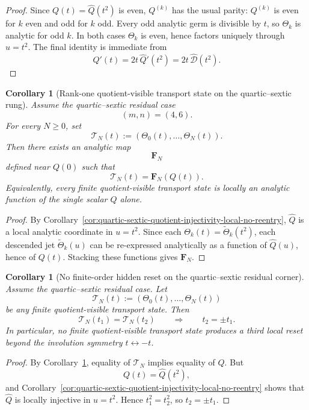 \documentclass[11pt,a4paper]{amsart}
\theoremstyle{plain}
\newtheorem{corollary}[theorem]{Corollary}
\theoremstyle{definition}
\begin{document}
\begin{proof}
Since $Q(t)=\widehat Q(t^2)$ is even, $Q^{(k)}$ has the usual parity:
$Q^{(k)}$ is even for $k$ even and odd for $k$ odd. Every odd analytic
germ is divisible by $t$, so $\Theta_k$ is analytic for odd $k$. In both
cases $\Theta_k$ is even, hence factors uniquely through $u=t^2$. The final
identity is immediate from
\[
Q'(t)=2t\,\widehat Q'(t^2)=2t\,\widehat{\mathcal D}(t^2).
\]
\end{proof}

\begin{corollary}[Rank-one quotient-visible transport state on the quartic--sextic rung]
\label{cor:rank-one-transport-state-quartic-sextic-fixed-shear}
Assume the quartic--sextic residual case
\[
(m,n)=(4,6).
\]
For every $N\ge 0$, set
\[
\mathcal T_N(t):=(\Theta_0(t),\dots,\Theta_N(t)).
\]
Then there exists an analytic map
\[
\mathbf F_N
\]
defined near $Q(0)$ such that
\[
\mathcal T_N(t)=\mathbf F_N(Q(t)).
\]
Equivalently, every finite quotient-visible transport state is locally an
analytic function of the single scalar $Q$ alone.
\end{corollary}

\begin{proof}
By
Corollary~\ref{cor:quartic-sextic-quotient-injectivity-local-no-reentry},
$\widehat Q$ is a local analytic coordinate in $u=t^2$. Since each
$\Theta_k(t)=\widetilde\Theta_k(t^2)$, each descended jet
$\widetilde\Theta_k(u)$ can be re-expressed analytically as a function of
$\widehat Q(u)$, hence of $Q(t)$. Stacking these functions gives
$\mathbf F_N$.
\end{proof}

\begin{corollary}[No finite-order hidden reset on the quartic--sextic residual corner]
\label{cor:no-finite-order-hidden-reset-quartic-sextic-fixed-shear}
Assume the quartic--sextic residual case. Let
\[
\mathcal T_N(t):=(\Theta_0(t),\dots,\Theta_N(t))
\]
be any finite quotient-visible transport state. Then
\[
\mathcal T_N(t_1)=\mathcal T_N(t_2)
\qquad\Longrightarrow\qquad
t_2=\pm t_1.
\]
In particular, no finite quotient-visible transport state produces a third local
reset beyond the involution symmetry $t\leftrightarrow -t$.
\end{corollary}

\begin{proof}
By
Corollary~\ref{cor:rank-one-transport-state-quartic-sextic-fixed-shear},
equality of $\mathcal T_N$ implies equality of $Q$. But
\[
Q(t)=\widehat Q(t^2),
\]
and
Corollary~\ref{cor:quartic-sextic-quotient-injectivity-local-no-reentry}
shows that $\widehat Q$ is locally injective in $u=t^2$. Hence
$t_1^2=t_2^2$, so $t_2=\pm t_1$.
\end{proof}
\end{document}
